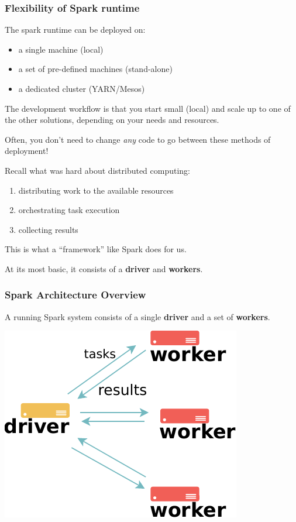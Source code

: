 \documentclass[english,serif,mathserif]{beamer}
\begin{document}
\begin{frame}
  \frametitle{Flexibility of Spark runtime}

  The spark runtime can be deployed on:
  \begin{itemize}
  \item
    a single machine (local)
  \item
    a set of pre-defined machines (stand-alone)
  \item
    a dedicated cluster (YARN/Mesos)
  \end{itemize}

  \+
  The development workflow is that you start small (local) and scale up to
  one of the other solutions, depending on your needs and resources.

  \+
  Often, you don't need to change \emph{any} code to go between these
  methods of deployment!
\end{frame}


\begin{frame}
  Recall what was hard about distributed computing:
  \begin{enumerate}
  \item
    distributing work to the available resources
  \item
    orchestrating task execution
  \item
    collecting results
  \end{enumerate}

  \+
  This is what a ``framework'' like Spark does for us.

  \+
  At its most basic, it consists of a \textbf{driver} and \textbf{workers}.
\end{frame}


\begin{frame}
  \frametitle{Spark Architecture Overview}

  \begin{center}
    A running Spark system consists of a single \textbf{driver}
    and a set of \textbf{workers}.

    \+
    \includegraphics{fig/spark_architecture.pdf}
  \end{center}
\end{frame}
\end{document}
